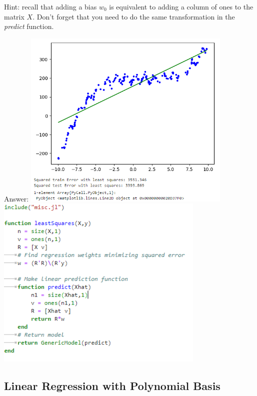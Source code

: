 \documentclass{article}
\def\ans#1{\par\gre{Answer: #1}}
\def\gre#1{{\color{gre}#1}}
\begin{document}
Hint: recall that adding a bias $w_0$ is equivalent to adding a column of ones to the matrix $X$. Don't forget that you need to do the same transformation in the \emph{predict} function.
\ans{\includegraphics[width=10cm]{Q31.PNG}\\
\includegraphics[width=10cm]{Q31Code.PNG}}

\subsection{Linear Regression with Polynomial Basis}
\end{document}
